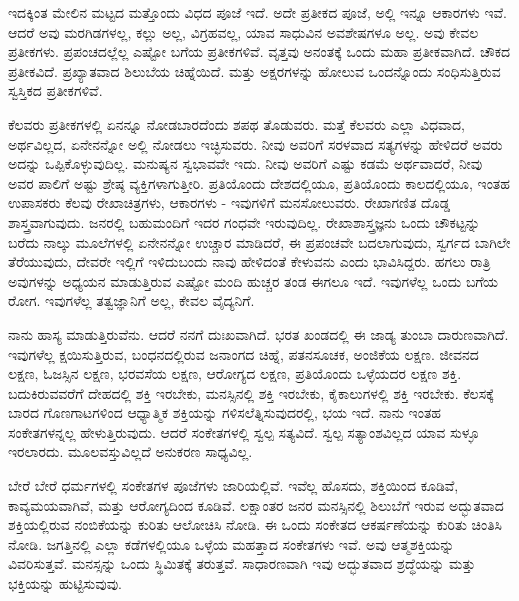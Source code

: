 ಇದಕ್ಕಿಂತ ಮೇಲಿನ ಮಟ್ಟದ ಮತ್ತೊಂದು ವಿಧದ ಪೂಜೆ ಇದೆ. ಅದೇ ಪ್ರತೀಕದ ಪೂಜೆ, ಅಲ್ಲಿ ಇನ್ನೂ ಆಕಾರಗಳು ಇವೆ. ಆದರೆ ಅವು ಮರಗಿಡಗಳಲ್ಲ, ಕಲ್ಲು ಅಲ್ಲ, ವಿಗ್ರಹವಲ್ಲ, ಯಾವ ಸಾಧುವಿನ ಅವಶೇಷಗಳೂ ಅಲ್ಲ. ಅವು ಕೇವಲ ಪ್ರತೀಕಗಳು. ಪ್ರಪಂಚದಲ್ಲೆಲ್ಲ ಎಷ್ಟೋ ಬಗೆಯ ಪ್ರತೀಕಗಳಿವೆ. ವೃತ್ತವು ಅನಂತಕ್ಕೆ ಒಂದು ಮಹಾ ಪ್ರತೀಕವಾಗಿದೆ. ಚೌಕದ ಪ್ರತೀಕವಿದೆ. ಪ್ರಖ್ಯಾತವಾದ ಶಿಲುಬೆಯ ಚಿಹ್ನೆಯಿದೆ.\break {} ಮತ್ತು  ಅಕ್ಷರಗಳನ್ನು ಹೋಲುವ ಒಂದನ್ನೊಂದು ಸಂಧಿಸುತ್ತಿರುವ ಸ್ವಸ್ತಿಕದ ಪ್ರತೀಕಗಳಿವೆ.

ಕೆಲವರು ಪ್ರತೀಕಗಳಲ್ಲಿ ಏನನ್ನೂ ನೋಡಬಾರದೆಂದು ಶಪಥ ತೊಡುವರು. ಮತ್ತೆ ಕೆಲವರು ಎಲ್ಲಾ ವಿಧವಾದ, ಅರ್ಥವಿಲ್ಲದ, ಏನೇನನ್ನೋ ಅಲ್ಲಿ ನೋಡಲು ಇಚ್ಛಿಸುವರು. ನೀವು ಅವರಿಗೆ ಸರಳವಾದ ಸತ್ಯಗಳನ್ನು ಹೇಳಿದರೆ ಅವರು ಅದನ್ನು ಒಪ್ಪಿಕೊಳ್ಳುವುದಿಲ್ಲ. ಮನುಷ್ಯನ ಸ್ವಭಾವವೇ ಇದು. ನೀವು ಅವರಿಗೆ ಎಷ್ಟು ಕಡಮೆ ಅರ್ಥವಾದರೆ, ನೀವು ಅವರ ಪಾಲಿಗೆ ಅಷ್ಟು ಶ್ರೇಷ್ಠ ವ್ಯಕ್ತಿಗಳಾಗುತ್ತೀರಿ. ಪ್ರತಿಯೊಂದು ದೇಶದಲ್ಲಿಯೂ, ಪ್ರತಿಯೊಂದು ಕಾಲದಲ್ಲಿಯೂ, ಇಂತಹ ಉಪಾಸಕರು ಕೆಲವು ರೇಖಾಚಿತ್ರಗಳು, ಆಕಾರಗಳು - ಇವುಗಳಿಗೆ ಮನಸೋಲುವರು. ರೇಖಾಗಣಿತ ದೊಡ್ಡ ಶಾಸ್ತ್ರವಾಗುವುದು. ಜನರಲ್ಲಿ ಬಹುಮಂದಿಗೆ ಇದರ ಗಂಧವೇ ಇರುವುದಿಲ್ಲ. ರೇಖಾಶಾಸ್ತ್ರಜ್ಞನು ಒಂದು ಚೌಕಟ್ಟನ್ನು ಬರೆದು ನಾಲ್ಕು ಮೂಲೆಗಳಲ್ಲಿ ಏನೇನನ್ನೋ ಉಚ್ಚಾರ ಮಾಡಿದರೆ, ಈ ಪ್ರಪಂಚವೇ ಬದಲಾಗುವುದು, ಸ್ವರ್ಗದ ಬಾಗಿಲೇ ತೆರೆಯುವುದು, ದೇವರೇ ಇಲ್ಲಿಗೆ ಇಳಿದುಬಂದು ನಾವು ಹೇಳಿದಂತೆ ಕೇಳುವನು ಎಂದು ಭಾವಿಸಿದ್ದರು. ಹಗಲು ರಾತ್ರಿ ಅವುಗಳನ್ನು ಅಧ್ಯಯನ ಮಾಡುತ್ತಿರುವ ಎಷ್ಟೋ ಮಂದಿ ಹುಚ್ಚರ ತಂಡ ಈಗಲೂ ಇದೆ. ಇವುಗಳೆಲ್ಲ ಒಂದು ಬಗೆಯ ರೋಗ. ಇವುಗಳೆಲ್ಲ ತತ್ವಜ್ಞಾನಿಗೆ ಅಲ್ಲ, ಕೇವಲ ವೈದ್ಯನಿಗೆ.

ನಾನು ಹಾಸ್ಯ ಮಾಡುತ್ತಿರುವೆನು. ಆದರೆ ನನಗೆ ದುಃಖವಾಗಿದೆ. ಭರತ ಖಂಡದಲ್ಲಿ ಈ ಜಾಡ್ಯ ತುಂಬಾ ದಾರುಣವಾಗಿದೆ. ಇವುಗಳೆಲ್ಲ ಕ್ಷಯಿಸುತ್ತಿರುವ, ಬಂಧನದಲ್ಲಿರುವ ಜನಾಂಗದ ಚಿಹ್ನೆ, ಪತನಸೂಚಕ, ಅಂಜಿಕೆಯ ಲಕ್ಷಣ. ಜೀವನದ ಲಕ್ಷಣ, ಓಜಸ್ಸಿನ ಲಕ್ಷಣ, ಭರವಸೆಯ ಲಕ್ಷಣ, ಆರೋಗ್ಯದ ಲಕ್ಷಣ, ಪ್ರತಿಯೊಂದು ಒಳ್ಳೆಯದರ ಲಕ್ಷಣ ಶಕ್ತಿ. ಬದುಕಿರುವವರೆಗೆ ದೇಹದಲ್ಲಿ ಶಕ್ತಿ ಇರಬೇಕು, ಮನಸ್ಸಿನಲ್ಲಿ ಶಕ್ತಿ ಇರಬೇಕು, ಕೈಕಾಲುಗಳಲ್ಲಿ ಶಕ್ತಿ ಇರಬೇಕು. ಕೆಲಸಕ್ಕೆ ಬಾರದ ಗೊಣಗಾಟಗಳಿಂದ ಆಧ್ಯಾತ್ಮಿಕ ಶಕ್ತಿಯನ್ನು ಗಳಿಸಲೆತ್ನಿಸುವುದರಲ್ಲಿ, ಭಯ ಇದೆ. ನಾನು ಇಂತಹ ಸಂಕೇತಗಳನ್ನಲ್ಲ ಹೇಳುತ್ತಿರುವುದು. ಆದರೆ ಸಂಕೇತಗಳಲ್ಲಿ ಸ್ವಲ್ಪ ಸತ್ಯವಿದೆ. ಸ್ವಲ್ಪ ಸತ್ಯಾಂಶವಿಲ್ಲದ ಯಾವ ಸುಳ್ಳೂ ಇರಲಾರದು. ಮೂಲವಸ್ತುವಿಲ್ಲದೆ ಅನುಕರಣ ಸಾಧ್ಯವಿಲ್ಲ.

ಬೇರೆ ಬೇರೆ ಧರ್ಮಗಳಲ್ಲಿ ಸಂಕೇತಗಳ ಪೂಜೆಗಳು ಜಾರಿಯಲ್ಲಿವೆ. ಇವೆಲ್ಲ ಹೊಸದು, ಶಕ್ತಿಯಿಂದ ಕೂಡಿವೆ, ಕಾವ್ಯಮಯವಾಗಿವೆ, ಮತ್ತು ಆರೋಗ್ಯದಿಂದ ಕೂಡಿವೆ. ಲಕ್ಷಾಂತರ ಜನರ ಮನಸ್ಸಿನಲ್ಲಿ ಶಿಲುಬೆಗೆ ಇರುವ ಅದ್ಭುತವಾದ ಶಕ್ತಿಯಲ್ಲಿರುವ ನಂಬಿಕೆಯನ್ನು ಕುರಿತು ಆಲೋಚಿಸಿ ನೋಡಿ. ಈ ಒಂದು ಸಂಕೇತದ ಆಕರ್ಷಣೆಯನ್ನು ಕುರಿತು ಚಿಂತಿಸಿ ನೋಡಿ. ಜಗತ್ತಿನಲ್ಲಿ ಎಲ್ಲಾ ಕಡೆಗಳಲ್ಲಿಯೂ ಒಳ್ಳೆಯ ಮಹತ್ತಾದ ಸಂಕೇತಗಳು ಇವೆ. ಅವು ಆತ್ಮಶಕ್ತಿಯನ್ನು ವಿವರಿಸುತ್ತವೆ. ಮನಸ್ಸನ್ನು ಒಂದು ಸ್ಥಿಮಿತಕ್ಕೆ ತರುತ್ತವೆ. ಸಾಧಾರಣವಾಗಿ ಇವು ಅದ್ಭುತವಾದ ಶ್ರದ್ಧೆಯನ್ನು ಮತ್ತು ಭಕ್ತಿಯನ್ನು ಹುಟ್ಟಿಸುವುವು.

\newpage

